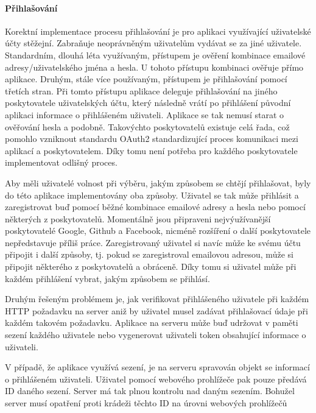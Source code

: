 \begin{itemize}
\begin{itemize}
			\paragraph{Přihlašování}

			Korektní implementace procesu přihlašování je pro aplikaci využívající uživatelské účty stěžejní.
			Zabraňuje neoprávněným uživatelům vydávat se za jiné uživatele.
			Standardním, dlouhá léta využívaným, přístupem je ověření kombinace emailové adresy/uživatelského jména
			a hesla.
			U tohoto přístupu kombinaci ověřuje přímo aplikace.
			Druhým, stále více používaným, přístupem je přihlašování pomocí třetích stran.
			Při tomto přístupu aplikace deleguje přihlašování na jiného poskytovatele uživatelských účtu, který následně
			vrátí po přihlášení původní aplikaci informace o přihlášeném uživateli.
			Aplikace se tak nemusí starat o ověřování hesla a podobně.
			Takovýchto poskytovatelů existuje celá řada, což pomohlo vzniknout standardu OAuth2 standardizující proces
			komunikaci mezi aplikací a poskytovatelem.
			Díky tomu není potřeba pro každého poskytovatele implementovat odlišný proces.

			Aby měli uživatelé volnost při výběru, jakým způsobem se chtějí přihlašovat, byly do této aplikace implementovány
			oba způsoby.
			Uživatel se tak může přihlásit a zaregistrovat buď pomocí běžné kombinace emailové adresy a hesla nebo pomocí
			některých z poskytovatelů.
			Momentálně jsou připraveni nejvýužívanější poskytovatelé Google, Github a Facebook, nicméně rozšíření o
			další poskytovatele nepředstavuje příliš práce.
			Zaregistrovaný uživatel si navíc může ke svému účtu připojit i další způsoby, tj. pokud se zaregistroval emailovou
			adresou, může si připojit některého z poskytovatelů a obráceně.
			Díky tomu si uživatel může při každém přihlášení vybrat, jakým způsobem se přihlásí.

			Druhým řešeným problémem je, jak verifikovat přihlášeného uživatele při každém \ac{HTTP} požadavku na server
			aniž by uživatel musel zadávat přihlašovací údaje při každém takovém požadavku.
			Aplikace na serveru může buď udržovat v paměti sezení každého uživatele nebo vygenerovat uživateli token
			obsahující informace o uživateli.

			V případě, že aplikace využívá sezení, je na serveru spravován objekt se informací o přihlášeném uživateli.
			Uživatel pomocí webového prohlížeče pak pouze předává ID daného sezení.
			Server má tak plnou kontrolu nad daným sezením.
			Bohužel server musí opatření proti krádeži těchto ID na úrovni webových prohlížečů


\end{itemize}
\end{itemize}
